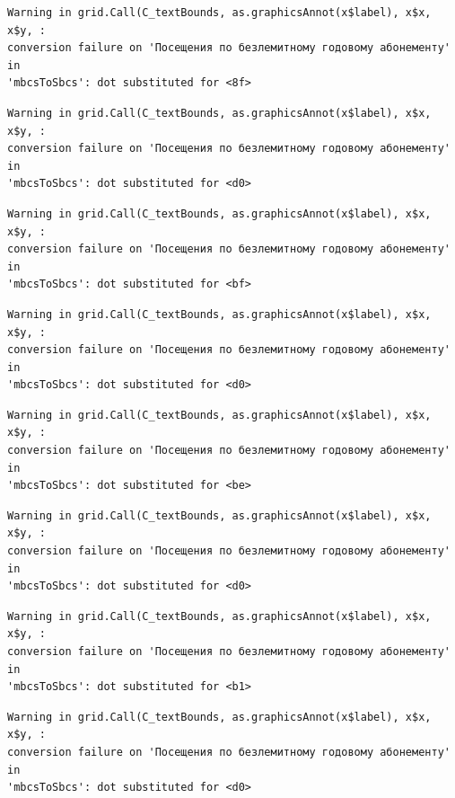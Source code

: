 \documentclass[
  letterpaper,
  DIV=11,
  numbers=noendperiod]{scrartcl}
\begin{document}
\begin{verbatim}
Warning in grid.Call(C_textBounds, as.graphicsAnnot(x$label), x$x, x$y, :
conversion failure on 'Посещения по безлемитному годовому абонементу' in
'mbcsToSbcs': dot substituted for <8f>
\end{verbatim}

\begin{verbatim}
Warning in grid.Call(C_textBounds, as.graphicsAnnot(x$label), x$x, x$y, :
conversion failure on 'Посещения по безлемитному годовому абонементу' in
'mbcsToSbcs': dot substituted for <d0>
\end{verbatim}

\begin{verbatim}
Warning in grid.Call(C_textBounds, as.graphicsAnnot(x$label), x$x, x$y, :
conversion failure on 'Посещения по безлемитному годовому абонементу' in
'mbcsToSbcs': dot substituted for <bf>
\end{verbatim}

\begin{verbatim}
Warning in grid.Call(C_textBounds, as.graphicsAnnot(x$label), x$x, x$y, :
conversion failure on 'Посещения по безлемитному годовому абонементу' in
'mbcsToSbcs': dot substituted for <d0>
\end{verbatim}

\begin{verbatim}
Warning in grid.Call(C_textBounds, as.graphicsAnnot(x$label), x$x, x$y, :
conversion failure on 'Посещения по безлемитному годовому абонементу' in
'mbcsToSbcs': dot substituted for <be>
\end{verbatim}

\begin{verbatim}
Warning in grid.Call(C_textBounds, as.graphicsAnnot(x$label), x$x, x$y, :
conversion failure on 'Посещения по безлемитному годовому абонементу' in
'mbcsToSbcs': dot substituted for <d0>
\end{verbatim}

\begin{verbatim}
Warning in grid.Call(C_textBounds, as.graphicsAnnot(x$label), x$x, x$y, :
conversion failure on 'Посещения по безлемитному годовому абонементу' in
'mbcsToSbcs': dot substituted for <b1>
\end{verbatim}

\begin{verbatim}
Warning in grid.Call(C_textBounds, as.graphicsAnnot(x$label), x$x, x$y, :
conversion failure on 'Посещения по безлемитному годовому абонементу' in
'mbcsToSbcs': dot substituted for <d0>
\end{verbatim}
\end{document}
